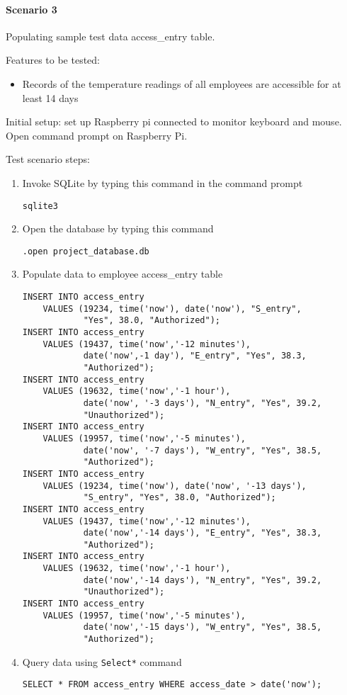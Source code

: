 \paragraph{Scenario 3}
Populating sample test data access\_entry table.

\noindent
Features to be tested:
\begin{itemize}
    \item Records of the temperature readings of all employees are accessible
          for at least 14 days
\end{itemize}

\noindent
Initial setup: set up Raspberry pi connected to monitor keyboard and mouse.
Open command prompt on Raspberry Pi.

\noindent
Test scenario steps:
\begin{enumerate}
    \item Invoke SQLite by typing this command in the command prompt
\begin{lstlisting}
sqlite3
\end{lstlisting}
    \item Open the database by typing this command 
\begin{lstlisting}
.open project_database.db
\end{lstlisting}
    \item Populate data to employee access\_entry table 
\begin{lstlisting}
INSERT INTO access_entry
    VALUES (19234, time('now'), date('now'), "S_entry",
            "Yes", 38.0, "Authorized");
INSERT INTO access_entry
    VALUES (19437, time('now','-12 minutes'),
            date('now',-1 day'), "E_entry", "Yes", 38.3,
            "Authorized");
INSERT INTO access_entry
    VALUES (19632, time('now','-1 hour'),
            date('now', '-3 days'), "N_entry", "Yes", 39.2,
            "Unauthorized");
INSERT INTO access_entry
    VALUES (19957, time('now','-5 minutes'),
            date('now', '-7 days'), "W_entry", "Yes", 38.5,
            "Authorized");
INSERT INTO access_entry
    VALUES (19234, time('now'), date('now', '-13 days'),
            "S_entry", "Yes", 38.0, "Authorized");
INSERT INTO access_entry
    VALUES (19437, time('now','-12 minutes'),
            date('now','-14 days'), "E_entry", "Yes", 38.3,
            "Authorized");
INSERT INTO access_entry
    VALUES (19632, time('now','-1 hour'),
            date('now','-14 days'), "N_entry", "Yes", 39.2,
            "Unauthorized");
INSERT INTO access_entry
    VALUES (19957, time('now','-5 minutes'),
            date('now','-15 days'), "W_entry", "Yes", 38.5,
            "Authorized");
\end{lstlisting}
    \item Query data using \lstinline{Select*} command
\begin{lstlisting}
SELECT * FROM access_entry WHERE access_date > date('now');
\end{lstlisting}
\end{enumerate}

